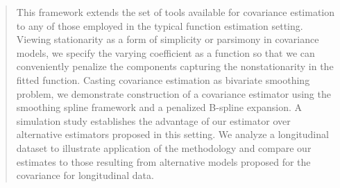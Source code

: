 \begin{quote}
This framework extends the set of tools available for covariance estimation to any of those employed in the typical function estimation setting. Viewing stationarity as a form of simplicity or parsimony in covariance models, we specify the varying coefficient as a function so that we can conveniently penalize the components capturing the nonstationarity in the fitted function. Casting covariance estimation as bivariate smoothing problem, we demonstrate construction of a covariance estimator using the smoothing spline framework and a penalized B-spline expansion.
\bigskip
A simulation study establishes the advantage of our estimator over alternative estimators proposed in this setting. We analyze a longitudinal dataset to illustrate application of the methodology and compare our estimates to those resulting from alternative models proposed for the covariance for longitudinal data. 



\end{quote}


